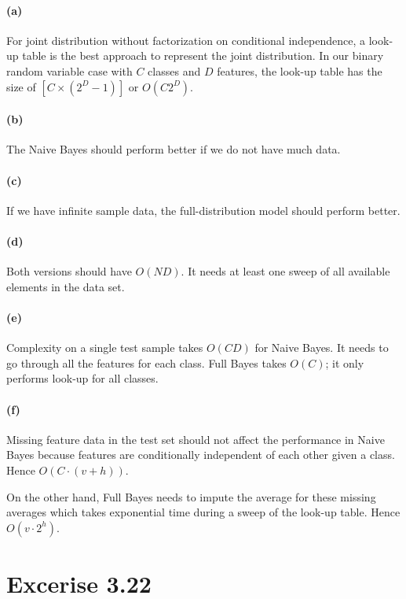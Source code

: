 \documentclass[12pt, letterpaper]{article}
\begin{document}
\paragraph{(a)}
For joint distribution without factorization on conditional independence, a look-up table is the
best approach to represent the joint distribution. In our binary random variable case with
$C$ classes and $D$ features, the look-up table has the size of $[C \times (2^D - 1)]$ or $O(C2^D)$.

\paragraph{(b)}
The Naive Bayes should perform better if we do not have much data.

\paragraph{(c)}
If we have infinite sample data, the full-distribution model should perform better.

\paragraph{(d)}
Both versions should have $O(ND)$. It needs at least one sweep of all available elements in the data set.

\paragraph{(e)}
Complexity on a single test sample takes $O(CD)$ for Naive Bayes. It needs to go through all the features
for each class. Full Bayes takes $O(C)$; it only performs look-up for all classes.

\paragraph{(f)}
Missing feature data in the test set should not affect the performance in Naive Bayes because features are
conditionally independent of each other given a class. Hence $O(C \cdot (v+h))$.

On the other hand, Full Bayes needs to impute the average for these missing averages which takes
exponential time during a sweep of the look-up table. Hence $O(v \cdot 2^h)$.

\section{Excerise 3.22}
\end{document}
